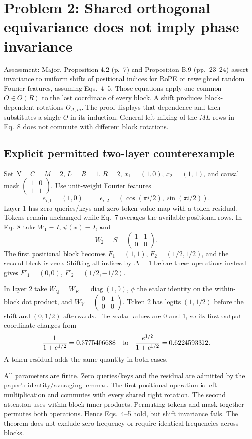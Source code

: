 \documentclass[10pt]{article}
\begin{document}
\section*{Problem 2: Shared orthogonal equivariance does not imply phase invariance}
Assessment: Major. Proposition 4.2 (p. 7) and Proposition B.9 (pp. 23–24) assert invariance to uniform shifts of positional indices for RoPE or reweighted random Fourier features, assuming Eqs. 4–5. Those equations apply one common \(O\in O(R)\) to the last coordinate of every block. A shift produces block-dependent rotations \(O_{\Delta,m}\). The proof displays that dependence and then substitutes a single \(O\) in its induction. General left mixing of the \(ML\) rows in Eq. 8 does not commute with different block rotations.\par
\subsection*{Explicit permitted two-layer counterexample}
Set \(N=C=M=2\), \(L=B=1\), \(R=2\), \(x_1=(1,0)\), \(x_2=(1,1)\), and causal mask \(\left(\begin{smallmatrix}1&0\\1&1\end{smallmatrix}\right)\). Use unit-weight Fourier features \[e_{i,1}=(1,0),\qquad e_{i,2}=(\cos(\pi i/2),\sin(\pi i/2)).\] Layer 1 has zero queries/keys and zero token value map with a token residual. Tokens remain unchanged while Eq. 7 averages the available positional rows. In Eq. 8 take \(W_1=I\), \(\psi(x)=I\), and \[W_2=S=\begin{pmatrix}1&1\\0&0\end{pmatrix}.\] The first positional block becomes \(F_1=(1,1)\), \(F_2=(1/2,1/2)\), and the second block is zero. Shifting all indices by \(\Delta=1\) before these operations instead gives \(F'_1=(0,0)\), \(F'_2=(1/2,-1/2)\).\par
In layer 2 take \(W_Q=W_K=\operatorname{diag}(1,0)\), \(\phi\) the scalar identity on the within-block dot product, and \(W_V=\left(\begin{smallmatrix}0&1\\0&0\end{smallmatrix}\right)\). Token 2 has logits \((1,1/2)\) before the shift and \((0,1/2)\) afterwards. The scalar values are 0 and 1, so its first output coordinate changes from \[\frac{1}{1+e^{1/2}}=0.3775406688
 \quad\hbox{to}\quad
 \frac{e^{1/2}}{1+e^{1/2}}=0.6224593312.\] A token residual adds the same quantity in both cases.\par
All parameters are finite. Zero queries/keys and the residual are admitted by the paper’s identity/averaging lemmas. The first positional operation is left multiplication and commutes with every shared right rotation. The second attention uses within-block inner products. Permuting tokens and mask together permutes both operations. Hence Eqs. 4–5 hold, but shift invariance fails. The theorem does not exclude zero frequency or require identical frequencies across blocks.\par
\end{document}
